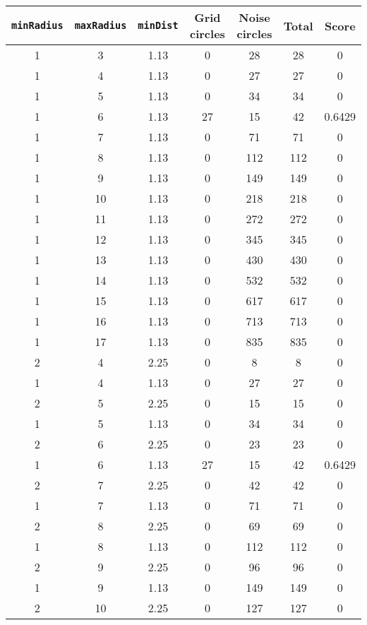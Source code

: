 \documentclass[letterpaper, 12pt]{article}
\begin{document}
\begin{longtable}{|c|c|c|c|c|c|c|}
\hline
\textbf{\texttt{minRadius}} & \textbf{\texttt{maxRadius}} & \textbf{\texttt{minDist}} & \textbf{Grid circles} & \textbf{Noise circles} & \textbf{Total} & \textbf{Score} \\
\hline
1 & 3 & 1.13 & 0 & 28 & 28 & 0 \\
\hline
1 & 4 & 1.13 & 0 & 27 & 27 & 0 \\
\hline
1 & 5 & 1.13 & 0 & 34 & 34 & 0 \\
\hline
1 & 6 & 1.13 & 27 & 15 & 42 & 0.6429 \\
\hline
1 & 7 & 1.13 & 0 & 71 & 71 & 0 \\
\hline
1 & 8 & 1.13 & 0 & 112 & 112 & 0 \\
\hline
1 & 9 & 1.13 & 0 & 149 & 149 & 0 \\
\hline
1 & 10 & 1.13 & 0 & 218 & 218 & 0 \\
\hline
1 & 11 & 1.13 & 0 & 272 & 272 & 0 \\
\hline
1 & 12 & 1.13 & 0 & 345 & 345 & 0 \\
\hline
1 & 13 & 1.13 & 0 & 430 & 430 & 0 \\
\hline
1 & 14 & 1.13 & 0 & 532 & 532 & 0 \\
\hline
1 & 15 & 1.13 & 0 & 617 & 617 & 0 \\
\hline
1 & 16 & 1.13 & 0 & 713 & 713 & 0 \\
\hline
1 & 17 & 1.13 & 0 & 835 & 835 & 0 \\
\hline
2 & 4 & 2.25 & 0 & 8 & 8 & 0 \\
\hline
1 & 4 & 1.13 & 0 & 27 & 27 & 0 \\
\hline
2 & 5 & 2.25 & 0 & 15 & 15 & 0 \\
\hline
1 & 5 & 1.13 & 0 & 34 & 34 & 0 \\
\hline
2 & 6 & 2.25 & 0 & 23 & 23 & 0 \\
\hline
1 & 6 & 1.13 & 27 & 15 & 42 & 0.6429 \\
\hline
2 & 7 & 2.25 & 0 & 42 & 42 & 0 \\
\hline
1 & 7 & 1.13 & 0 & 71 & 71 & 0 \\
\hline
2 & 8 & 2.25 & 0 & 69 & 69 & 0 \\
\hline
1 & 8 & 1.13 & 0 & 112 & 112 & 0 \\
\hline
2 & 9 & 2.25 & 0 & 96 & 96 & 0 \\
\hline
1 & 9 & 1.13 & 0 & 149 & 149 & 0 \\
\hline
2 & 10 & 2.25 & 0 & 127 & 127 & 0 \\

\end{longtable}
\end{document}
